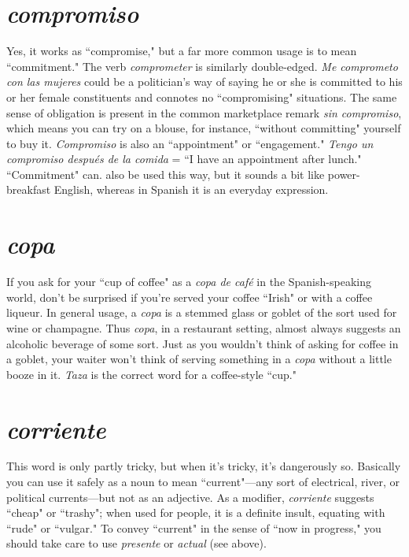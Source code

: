 \section{\emph{compromiso}}

Yes, it works as ``compromise," but a far more
common usage is to mean ``commitment." The verb \emph{comprometer} is
similarly double-edged. \emph{Me comprometo con las mujeres} could be a
politician's way of saying he or she is committed to his or her female
constituents and connotes no ``compromising" situations. The same
sense of obligation is present in the common marketplace remark
\emph{sin compromiso}, which means you can try on a blouse, for instance,
``without committing" yourself to buy it. \emph{Compromiso} is also an
``appointment" or ``engagement." \emph{Tengo un compromiso después de la
comida} = ``I have an appointment after lunch." ``Commitment" can.
also be used this way, but it sounds a bit like power-breakfast English,
whereas in Spanish it is an everyday expression.

\section{\emph{copa}}

If you ask for your ``cup of coffee" as a \emph{copa de café} in
the Spanish-speaking world, don't be surprised if you're served your
coffee ``Irish" or with a coffee liqueur. In general usage, a \emph{copa} is a
stemmed glass or goblet of the sort used for wine or champagne. Thus
\emph{copa}, in a restaurant setting, almost always suggests an alcoholic beverage of some sort. Just as you wouldn't think of asking for coffee in a
goblet, your waiter won't think of serving something in a \emph{copa} without
a little booze in it. \emph{Taza} is the correct word for a coffee-style ``cup."

\section{\emph{corriente}}

This word is only partly tricky, but when it's
tricky, it's dangerously so. Basically you can use it safely as a noun to
mean ``current"---any sort of electrical, river, or political currents---but not as an adjective. As a modifier, \emph{corriente} suggests ``cheap" or
``trashy"; when used for people, it is a definite insult, equating with
``rude" or ``vulgar." To convey ``current" in the sense of ``now in progress," you should take care to use \emph{presente} or \emph{actual} (see above).

